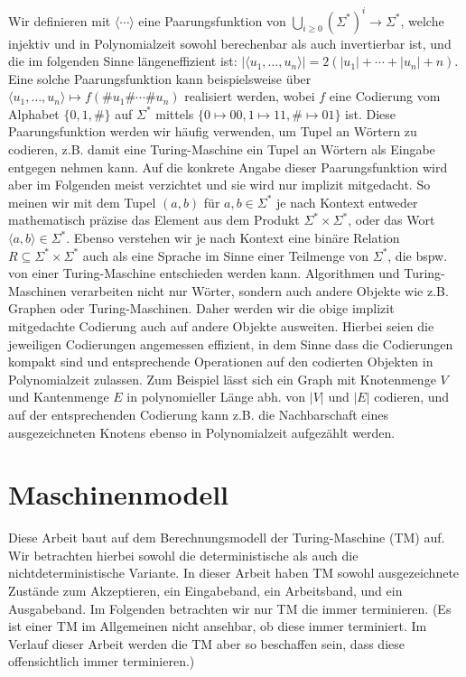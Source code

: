 Wir definieren mit $\langle\cdots\rangle$ eine Paarungsfunktion von $\bigcup_{i\geq 0} (\Sigma^*)^i \to \Sigma^*$, welche injektiv und in Polynomialzeit sowohl berechenbar als auch invertierbar ist, und die im folgenden Sinne längeneffizient ist: $|\langle u_1, \dots, u_n\rangle| = 2(|u_1|+\cdots+|u_n|+n)$. Eine solche Paarungsfunktion kann beispielsweise über $\langle u_1, \dots, u_n\rangle\mapsto f(\#u_1\#\cdots\#u_n)$ realisiert werden, wobei $f$ eine Codierung vom Alphabet $\{0,1,\#\}$ auf $\Sigma^*$ mittels $\{0\mapsto 00, 1\mapsto 11, \#\mapsto 01\}$ ist.
Diese Paarungsfunktion werden wir häufig verwenden, um Tupel an Wörtern zu codieren, z.B. damit eine Turing-Maschine ein Tupel an Wörtern als Eingabe entgegen nehmen kann. Auf die konkrete Angabe dieser Paarungsfunktion wird aber im Folgenden meist verzichtet und sie wird nur implizit mitgedacht. So meinen wir mit dem Tupel $(a,b)$ für $a,b\in\Sigma^*$ je nach Kontext entweder mathematisch präzise das Element aus dem Produkt $\Sigma^*\times\Sigma^*$, oder das Wort $\langle a,b\rangle\in\Sigma^*$. Ebenso verstehen wir je nach Kontext eine binäre Relation $R\subseteq\Sigma^*\times\Sigma^*$ auch als eine Sprache im Sinne einer Teilmenge von $\Sigma^*$, die bspw. von einer Turing-Maschine entschieden werden kann.
Algorithmen und Turing-Maschinen verarbeiten nicht nur Wörter, sondern auch andere Objekte wie z.B. Graphen oder Turing-Maschinen.
Daher werden wir die obige implizit mitgedachte Codierung auch auf andere Objekte ausweiten. Hierbei seien die jeweiligen Codierungen angemessen effizient, in dem Sinne dass die Codierungen kompakt sind und entsprechende Operationen auf den codierten Objekten in Polynomialzeit zulassen. Zum Beispiel lässt sich ein Graph mit Knotenmenge $V$ und Kantenmenge $E$ in polynomieller Länge abh. von $|V|$ und $|E|$ codieren, und auf der entsprechenden Codierung kann z.B. die Nachbarschaft eines ausgezeichneten Knotens ebenso in Polynomialzeit aufgezählt werden.

\section{Maschinenmodell}\label{sec:prelim-machines}

Diese Arbeit baut auf dem Berechnungsmodell der Turing-Maschine (TM) auf. Wir betrachten hierbei sowohl die deterministische als auch die nichtdeterministische Variante. In dieser Arbeit haben TM sowohl ausgezeichnete Zustände zum Akzeptieren, ein Eingabeband, ein Arbeitsband, und ein Ausgabeband. Im Folgenden betrachten wir nur TM die immer terminieren. (Es ist einer TM im Allgemeinen nicht ansehbar, ob diese immer terminiert. Im Verlauf dieser Arbeit werden die TM aber so beschaffen sein, dass diese offensichtlich immer terminieren.) 

